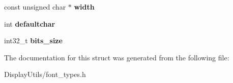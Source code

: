 \begin{DoxyCompactItemize}
\item 
const unsigned char $\ast$ {\bfseries width}\hypertarget{structfont__descriptor__t_a15c94573c8690a0ec940e3da4c80b0b9}{}\label{structfont__descriptor__t_a15c94573c8690a0ec940e3da4c80b0b9}

\item 
int {\bfseries defaultchar}\hypertarget{structfont__descriptor__t_a5bfad8f5e932dee64c856bce858f88d0}{}\label{structfont__descriptor__t_a5bfad8f5e932dee64c856bce858f88d0}

\item 
int32\+\_\+t {\bfseries bits\+\_\+size}\hypertarget{structfont__descriptor__t_a335c226d88f77b41d82ed53d6d28c022}{}\label{structfont__descriptor__t_a335c226d88f77b41d82ed53d6d28c022}

\end{DoxyCompactItemize}


The documentation for this struct was generated from the following file\+:\begin{DoxyCompactItemize}
\item 
Display\+Utils/font\+\_\+types.\+h\end{DoxyCompactItemize}
